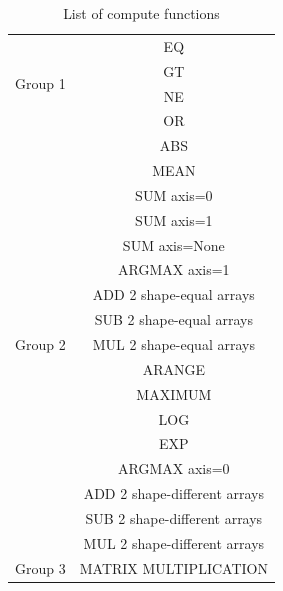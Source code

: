 \begin{table}[]
\centering
\caption{List of compute functions}
\label{list-func}
\begin{tabular}{|c|c|}
\hline
\multirow{4}{*}{Group 1} 					& EQ \\ \cline{2-2} 
\multirow{4}{*}{}                         	& GT \\ \cline{2-2} 
\multirow{4}{*}{}                         	& NE \\ \cline{2-2} 
\multirow{4}{*}{}                         	& OR \\ \hline

\multirow{17}{*}{Group 2} 	 				& ABS \\ \cline{2-2}
\multirow{17}{*}{} 							& MEAN \\ \cline{2-2}
\multirow{17}{*}{} 							& SUM axis=0 \\ \cline{2-2}
\multirow{17}{*}{} 							& SUM axis=1 \\ \cline{2-2}
\multirow{17}{*}{} 			 				& SUM axis=None \\ \cline{2-2}
\multirow{17}{*}{} 			 				& ARGMAX axis=1 \\ \cline{2-2}
\multirow{17}{*}{} 							& ADD 2 shape-equal arrays  \\ \cline{2-2}
\multirow{17}{*}{} 							& SUB 2 shape-equal arrays\\ \cline{2-2}
\multirow{17}{*}{} 							& MUL 2 shape-equal arrays \\ \cline{2-2}
\multirow{17}{*}{} 				 			& ARANGE \\ \cline{2-2}
\multirow{17}{*}{} 							& MAXIMUM \\ \cline{2-2}
\multirow{17}{*}{} 							& LOG \\ \cline{2-2}
\multirow{17}{*}{}		 					& EXP \\ \cline{2-2}
\multirow{17}{*}{} 							& ARGMAX axis=0 \\ \cline{2-2}
\multirow{17}{*}{}  							& ADD 2 shape-different arrays \\ \cline{2-2}
\multirow{17}{*}{} 		 					& SUB 2 shape-different arrays\\ \cline{2-2}
\multirow{17}{*}{} 		 					& MUL 2 shape-different arrays\\ \hline

Group 3 										& MATRIX MULTIPLICATION \\ \hline
\end{tabular}
\end{table}


